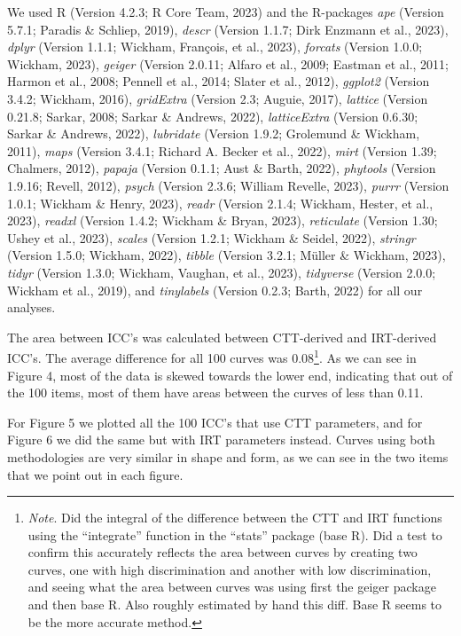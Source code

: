 \documentclass[
  jou]{apa6}
\begin{document}
We used R (Version 4.2.3; R Core Team, 2023) and the R-packages \emph{ape} (Version 5.7.1; Paradis \& Schliep, 2019), \emph{descr} (Version 1.1.7; Dirk Enzmann et al., 2023), \emph{dplyr} (Version 1.1.1; Wickham, François, et al., 2023), \emph{forcats} (Version 1.0.0; Wickham, 2023), \emph{geiger} (Version 2.0.11; Alfaro et al., 2009; Eastman et al., 2011; Harmon et al., 2008; Pennell et al., 2014; Slater et al., 2012), \emph{ggplot2} (Version 3.4.2; Wickham, 2016), \emph{gridExtra} (Version 2.3; Auguie, 2017), \emph{lattice} (Version 0.21.8; Sarkar, 2008; Sarkar \& Andrews, 2022), \emph{latticeExtra} (Version 0.6.30; Sarkar \& Andrews, 2022), \emph{lubridate} (Version 1.9.2; Grolemund \& Wickham, 2011), \emph{maps} (Version 3.4.1; Richard A. Becker et al., 2022), \emph{mirt} (Version 1.39; Chalmers, 2012), \emph{papaja} (Version 0.1.1; Aust \& Barth, 2022), \emph{phytools} (Version 1.9.16; Revell, 2012), \emph{psych} (Version 2.3.6; William Revelle, 2023), \emph{purrr} (Version 1.0.1; Wickham \& Henry, 2023), \emph{readr} (Version 2.1.4; Wickham, Hester, et al., 2023), \emph{readxl} (Version 1.4.2; Wickham \& Bryan, 2023), \emph{reticulate} (Version 1.30; Ushey et al., 2023), \emph{scales} (Version 1.2.1; Wickham \& Seidel, 2022), \emph{stringr} (Version 1.5.0; Wickham, 2022), \emph{tibble} (Version 3.2.1; Müller \& Wickham, 2023), \emph{tidyr} (Version 1.3.0; Wickham, Vaughan, et al., 2023), \emph{tidyverse} (Version 2.0.0; Wickham et al., 2019), and \emph{tinylabels} (Version 0.2.3; Barth, 2022) for all our analyses.

The area between ICC's was calculated between CTT-derived and IRT-derived ICC's. The average difference for all 100 curves was 0.08\footnote{\emph{Note}. Did the integral of the difference between the CTT and IRT functions using the ``integrate'' function in the ``stats'' package (base R). Did a test to confirm this accurately reflects the area between curves by creating two curves, one with high discrimination and another with low discrimination, and seeing what the area between curves was using first the geiger package and then base R. Also roughly estimated by hand this diff. Base R seems to be the more accurate method.}. As we can see in Figure 4, most of the data is skewed towards the lower end, indicating that out of the 100 items, most of them have areas between the curves of less than 0.11.

For Figure 5 we plotted all the 100 ICC's that use CTT parameters, and for Figure 6 we did the same but with IRT parameters instead. Curves using both methodologies are very similar in shape and form, as we can see in the two items that we point out in each figure.
\end{document}
